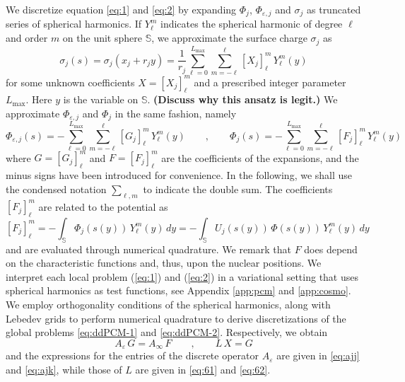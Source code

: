 We discretize equation \eqref{eq:1} and \eqref{eq:2} by expanding $\Phi_j$, $\Phi_{\varepsilon,j}$ and $\sigma_j$ as truncated series of spherical harmonics. If $Y_\ell^m$ indicates the spherical harmonic of degree $\ell$ and order $m$ on the unit sphere $\mathbb{S}$, we approximate the surface charge $\sigma_j$ as
\[
\sigma_j(s) = \sigma_j(x_j + r_j y) = \frac{1}{r_j}\sum_{\ell=0}^{L_\text{max}} \sum_{m = -\ell}^\ell [X_j]_\ell^m \, Y_\ell^m(y)
\]
for some unknown coefficients $X = [X_j]_\ell^m$ and a prescribed integer parameter ${L_\text{max}}$. Here $y$ is the variable on $\mathbb{S}$. {\bf (Discuss why this ansatz is legit.)} We approximate $\Phi_{\varepsilon,j}$ and $\Phi_j$ in the same fashion, namely
\[
\Phi_{\varepsilon,j}(s) = - \sum_{\ell=0}^{L_\text{max}} \sum_{m = -\ell}^\ell [G_j]_\ell^m \, Y_\ell^m(y) \qquad , \qquad \Phi_j(s) = -\sum_{\ell=0}^{L_\text{max}} \sum_{m = -\ell}^\ell [F_j]_\ell^m \, Y_\ell^m(y)
\]
where $G = [G_j]_\ell^m$ and $F = [F_j]_\ell^m$ are the coefficients of the expansions, and the minus signs have been introduced for convenience. In the following, we shall use the condensed notation $\sum_{\ell ,m}$ to indicate the double sum. The coefficients $[F_j]_\ell^m$ are related to the potential as
\begin{equation}\label{eq:25}
[F_j]_\ell^m = - \int_{\mathbb{S}} \Phi_j(s(y)) \, Y_\ell^m(y) \,dy = - \int_{\mathbb{S}} U_j(s(y)) \, \Phi(s(y)) \, Y_\ell^m(y) \,dy
\end{equation}
and are evaluated through numerical quadrature. We remark that $F$ does depend on the characteristic functions and, thus, upon the nuclear positions. We interpret each local problem (\ref{eq:1}) and (\ref{eq:2}) in a variational setting that uses spherical harmonics as test functions, see Appendix \ref{app:pcm} and \ref{app:cosmo}. We employ orthogonality conditions of the spherical harmonics, along with Lebedev grids to perform numerical quadrature to derive discretizations of the global problems \eqref{eq:ddPCM-1} and \eqref{eq:ddPCM-2}. Respectively, we obtain
\begin{equation}\label{eq:6}
A_\varepsilon \, G = A_\infty \, F \qquad , \qquad  L \, X = G
\end{equation}
and the expressions for the entries of the discrete operator $A_\varepsilon$ are given in \eqref{eq:ajj} and \eqref{eq:ajk}, while those of $L$ are given in \eqref{eq:61} and \eqref{eq:62}.


